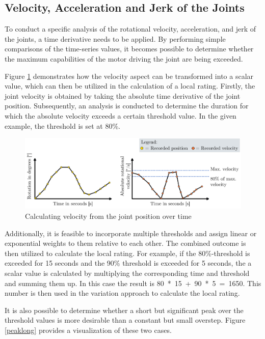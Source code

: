 \subsection{Velocity, Acceleration and Jerk of the Joints}\label{VAJJ}
To conduct a specific analysis of the rotational velocity, acceleration, and jerk of the joints, a time derivative needs to be applied. By performing simple comparisons of the time-series values, it becomes possible to determine whether the maximum capabilities of the motor driving the joint are being exceeded.

Figure \ref{velo} demonstrates how the velocity aspect can be transformed into a scalar value, which can then be utilized in the calculation of a local rating. Firstly, the joint velocity is obtained by taking the absolute time derivative of the joint position. Subsequently, an analysis is conducted to determine the duration for which the absolute velocity exceeds a certain threshold value. In the given example, the threshold is set at 80\%. 

\begin{figure}[H]
	\centerline{\includegraphics[width=1\textwidth]{figures/veloy.png}}
	\caption{Calculating velocity from the joint position over time}
	\label{velo}
\end{figure}

Additionally, it is feasible to incorporate multiple thresholds and assign linear or exponential weights to them relative to each other. The combined outcome is then utilized to calculate the local rating. For example, if the 80\%-threshold is exceeded for 15 seconds and the 90\% threshold is exceeded for 5 seconds, the a scalar value is calculated by multiplying the corresponding time and threshold and summing them up. In this case the result is 80~*~15~+~90~*~5~=~1650. This number is then used in the variation approach to calculate the local rating.

It is also possible to determine whether a short but significant peak over the threshold values is more desirable than a constant but small overstep. Figure \ref{peaklong} provides a visualization of these two cases.

